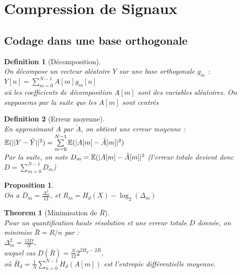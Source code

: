 \documentclass[a4paper]{article}
\newtheorem*{prop}{Proposition}
\newtheorem*{definition}{Definition}
\newtheorem*{theorem}{Theorem}
\newcommand{\E}{\ensuremath\mathbb{E}}
\renewcommand{\(}{\left(}
\renewcommand{\)}{\right)}
\begin{document}
\section{Compression de Signaux}

\subsection{Codage dans une base orthogonale}

\begin{definition}[Décomposition]~\\
On décompose un vecteur aléatoire $Y$ sur une base orthogonale $g_m$ :\\
$Y[n] = \sum\limits_{m=0}^{N-1}A[m]g_m[n]$\\
où les coefficients de décomposition
$A[m]$ sont des variables aléatoires. On supposeras par la suite que les $A[m]$
sont centrés
\end{definition}


\begin{definition}[Erreur moyenne]~\\
  En approximant $A$ par $\tilde{A}$, on obtient une erreur moyenne :\\
  $\E(||Y-\tilde{Y}||^2) = \sum\limits_{m=0}^{N-1}\E(|A[m]-\tilde{A}[m]|^2)$\\
  Par la suite, on note $D_m = \E(|A[m]-\tilde{A}[m]|^2$ (l'erreur totale
  devient donc $D = \sum\limits_{m=0}^{N-1}D_m$)
\end{definition}

\begin{prop}~\\
  On a $D_m = \frac{\Delta_m^2}{12}$, et $R_m = H_d(X) - \log_2(\Delta_m)$
\end{prop}

\begin{theorem}[Minimisation de $\bar{R}$]~\\
  Pour un quantification haute résolution et une erreur totale $D$ donnée, on
  minimise $\bar{R} = R/n$ par :\\
  $\Delta_m^2 = \frac{12D}{N}$,\\
  auquel cas $D(\bar{R}) = \frac{N}{12}2^{2\bar{H}_d-2\bar{R}}$,\\
  où $\bar{H}_d = \frac{1}{N}\sum\limits_{n=0}^{N-1}H_d(A[m])$ est l'entropie différentielle moyenne.
\end{theorem}
\end{document}
